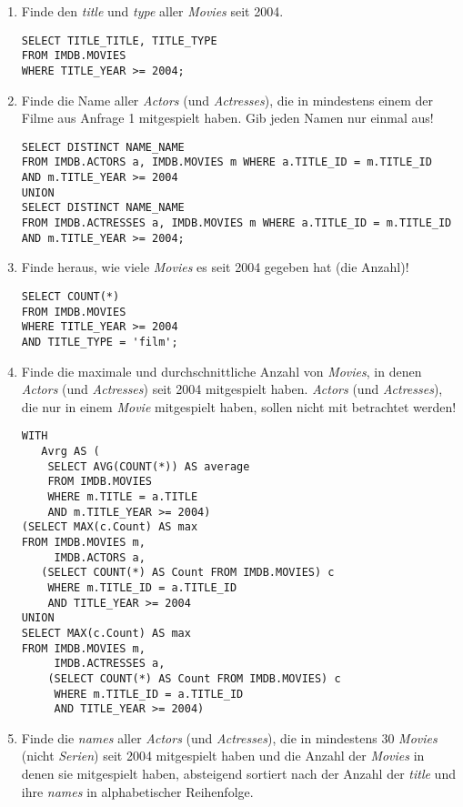 \documentclass[11pt,a4paper,DIV=9]{scrartcl}
\begin{document}
\begin{enumerate}

\item Finde den \textit{title} und \textit{type} aller \textit{Movies} seit 2004. 
\begin{lstlisting} 
SELECT TITLE_TITLE, TITLE_TYPE
FROM IMDB.MOVIES
WHERE TITLE_YEAR >= 2004;
\end{lstlisting}

\item Finde die Name aller \textit{Actors} (und \textit{Actresses}), die in mindestens einem der Filme aus Anfrage 1 mitgespielt haben. Gib jeden Namen nur einmal aus!
\begin{lstlisting}
SELECT DISTINCT NAME_NAME
FROM IMDB.ACTORS a, IMDB.MOVIES m WHERE a.TITLE_ID = m.TITLE_ID
AND m.TITLE_YEAR >= 2004
UNION
SELECT DISTINCT NAME_NAME
FROM IMDB.ACTRESSES a, IMDB.MOVIES m WHERE a.TITLE_ID = m.TITLE_ID
AND m.TITLE_YEAR >= 2004;
\end{lstlisting}

\item Finde heraus, wie viele \textit{Movies} es seit 2004 gegeben hat (die Anzahl)!
\begin{lstlisting}
SELECT COUNT(*)
FROM IMDB.MOVIES
WHERE TITLE_YEAR >= 2004
AND TITLE_TYPE = 'film';
\end{lstlisting}

\item Finde die maximale und durchschnittliche Anzahl von \textit{Movies}, in denen \textit{Actors} (und \textit{Actresses}) seit 2004 mitgespielt haben. \textit{Actors} (und \textit{Actresses}), die nur in einem \textit{Movie} mitgespielt haben, sollen nicht mit betrachtet werden!
\begin{lstlisting}
WITH
   Avrg AS (
	SELECT AVG(COUNT(*)) AS average 
	FROM IMDB.MOVIES 
	WHERE m.TITLE = a.TITLE		
	AND m.TITLE_YEAR >= 2004)
(SELECT MAX(c.Count) AS max
FROM IMDB.MOVIES m,
  	 IMDB.ACTORS a,
   (SELECT COUNT(*) AS Count FROM IMDB.MOVIES) c
	WHERE m.TITLE_ID = a.TITLE_ID
	AND TITLE_YEAR >= 2004
UNION
SELECT MAX(c.Count) AS max
FROM IMDB.MOVIES m,
	 IMDB.ACTRESSES a,
	(SELECT COUNT(*) AS Count FROM IMDB.MOVIES) c
	 WHERE m.TITLE_ID = a.TITLE_ID
	 AND TITLE_YEAR >= 2004)
\end{lstlisting}

\item Finde die \textit{names} aller \textit{Actors} (und \textit{Actresses}), die in mindestens 30 \textit{Movies} (nicht \textit{Serien}) seit 2004 mitgespielt haben und die Anzahl der \textit{Movies} in denen sie mitgespielt haben, absteigend sortiert nach der Anzahl der \textit{title} und ihre \textit{names} in alphabetischer Reihenfolge.
\begin{lstlisting}
\end{lstlisting}
\end{enumerate}
\end{document}
